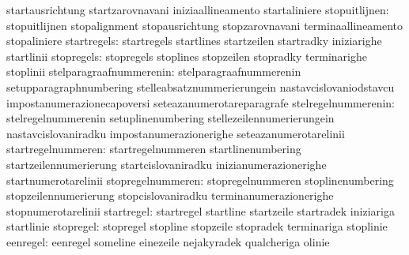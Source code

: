                                   startausrichtung                 startzarovnavani
                                  iniziaallineamento               startaliniere
                   stopuitlijnen: stopuitlijnen                    stopalignment
                                  stopausrichtung                  stopzarovnavani
                                  terminaallineamento              stopaliniere
                     startregels: startregels                      startlines
                                  startzeilen                      startradky
                                  iniziarighe                      startlinii
                      stopregels: stopregels                       stoplines
                                  stopzeilen                       stopradky
                                  terminarighe                     stoplinii
         stelparagraafnummerenin: stelparagraafnummerenin          setupparagraphnumbering
                                  stelleabsatznummerierungein      nastavcislovaniodstavcu
                                  impostanumerazionecapoversi      seteazanumerotareparagrafe
             stelregelnummerenin: stelregelnummerenin              setuplinenumbering
                                  stellezeilennumerierungein       nastavcislovaniradku
                                  impostanumerazionerighe          seteazanumerotarelinii
              startregelnummeren: startregelnummeren               startlinenumbering
                                  startzeilennumerierung           startcislovaniradku
                                  inizianumerazionerighe           startnumerotarelinii
               stopregelnummeren: stopregelnummeren                stoplinenumbering
                                  stopzeilennumerierung            stopcislovaniradku
                                  terminanumerazionerighe          stopnumerotarelinii
                      startregel: startregel                       startline
                                  startzeile                       startradek
                                  iniziariga                       startlinie
                       stopregel: stopregel                        stopline
                                  stopzeile                        stopradek
                                  terminariga                      stoplinie
                        eenregel: eenregel                         someline
                                  einezeile                        nejakyradek
                                  qualcheriga                      olinie
